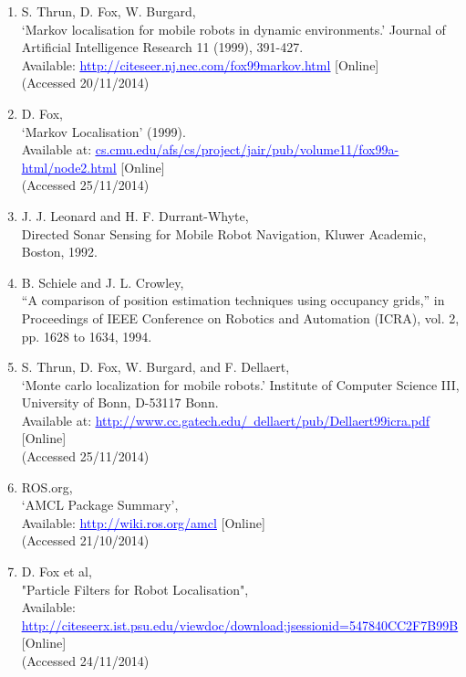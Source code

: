 \documentclass{article}
\begin{document}
\begin{enumerate}
\item S. Thrun, D. Fox, W. Burgard,
\\‘Markov localisation for mobile robots in dynamic environments.’ Journal of Artificial Intelligence Research 11 (1999), 391-427.
\\Available: \href{http://citeseer.nj.nec.com/fox99markov.html}{\textcolor{blue}{\uline{http://citeseer.nj.nec.com/fox99markov.html}}} [Online]
\\(Accessed 20/11/2014)

\item D. Fox,
\\‘Markov Localisation’ (1999).
\\ Available at: \href{http://www.cs.cmu.edu/afs/cs/project/jair/pub/volume11/fox99a-html/node2.html}{\textcolor{blue}{\uline{cs.cmu.edu/afs/cs/project/jair/pub/volume11/fox99a-html/node2.html}}} [Online]
\\(Accessed 25/11/2014)

\item J. J. Leonard and H. F. Durrant-Whyte,
\\Directed Sonar Sensing for Mobile Robot Navigation, Kluwer Academic, Boston, 1992.

\item B. Schiele and J. L. Crowley,
\\“A comparison of position estimation techniques using occupancy grids,” in Proceedings of IEEE Conference on Robotics and Automation (ICRA), vol. 2, pp. 1628 to 1634, 1994.

\item S. Thrun, D. Fox, W. Burgard, and F. Dellaert, 
\\‘Monte carlo localization for mobile robots.’ Institute of Computer Science III, University of Bonn, D-53117 Bonn.
\\Available at: \href{http://www.cc.gatech.edu/~dellaert/pub/Dellaert99icra.pdf}{\textcolor{blue}{\uline{http://www.cc.gatech.edu/~dellaert/pub/Dellaert99icra.pdf}}} [Online]
\\(Accessed 25/11/2014)

\item ROS.org,
\\‘AMCL Package Summary’,
\\Available: \href{http://wiki.ros.org/amcl}{\textcolor{blue}{\uline{http://wiki.ros.org/amcl}}}  [Online]
\\(Accessed 21/10/2014)

\item D. Fox et al,
\\"Particle Filters for Robot Localisation",
\\Available: \href{http://citeseerx.ist.psu.edu/viewdoc/download;jsessionid=547840CC2F7B99B070728AE1B1531BA1?doi=10.1.1.1.9914&rep=rep1&type=pdf}{\textcolor{blue}{\uline{http://citeseerx.ist.psu.edu/viewdoc/download;jsessionid=547840CC2F7B99B}}} [Online]
\\(Accessed 24/11/2014)


\end{enumerate}
\end{document}
